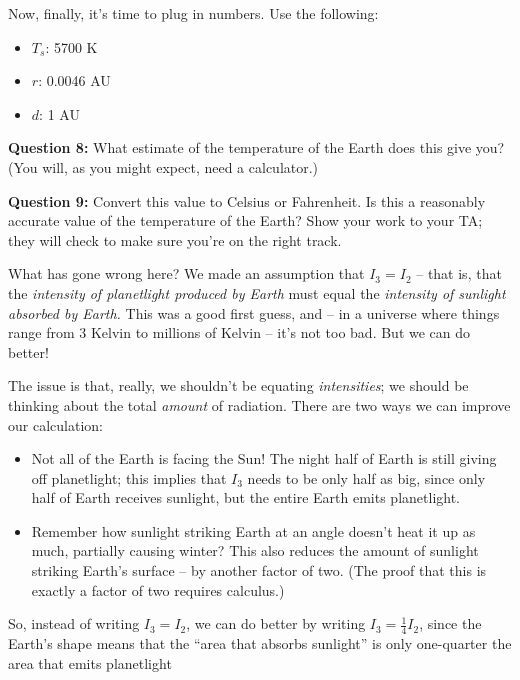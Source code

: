 \documentclass[11pt]{article}
\def\BI{\begin{itemize}}
\def\EI{\end{itemize}}
\begin{document}
Now, finally, it's time to plug in numbers. Use the following:

\BI
\item $T_s$: 5700 K
\item $r$: 0.0046 AU
\item $d$: 1 AU
\EI


{\bf Question 8:} What estimate of the temperature of the Earth does this give you? (You will, as you might expect, need a calculator.)

\vspace*{2cm}

\hrulefill

{\bf Question 9:} Convert this value to Celsius or Fahrenheit. Is this a reasonably accurate value of the temperature of the Earth? Show your work to your TA; they will check to make sure you're on the right track.

\vspace*{4cm}

\hrulefill

\vspace{1in}

What has gone wrong here? We made an assumption that $I_3=I_2$ -- that is, that the {\it intensity of planetlight produced by Earth} must equal the {\it intensity of sunlight absorbed by Earth.}
This was a good first guess, and -- in a universe where things range from 3 Kelvin to millions of Kelvin -- it's not too bad. But we can do better!

The issue is that, really, we shouldn't be equating {\it intensities}; we should be thinking about the total {\it amount} of radiation. There are two ways we can improve our calculation:

\BI
\item Not all of the Earth is facing the Sun! The night half of Earth is still giving off planetlight; this implies that $I_3$ needs to be only half as big, since only half of 
Earth receives sunlight, but the entire Earth emits planetlight.
\item Remember how sunlight striking Earth at an angle doesn't heat it up as much, partially causing winter? This also reduces the amount of sunlight striking Earth's surface -- by
another factor of two. (The proof that this is exactly a factor of two requires calculus.)
\EI

So, instead of writing $I_3 = I_2$, we can do better by writing $I_3 = \frac{1}{4} I_2$, since the Earth's shape means that the ``area that absorbs sunlight'' is only one-quarter
the area that emits planetlight 
\end{document}
